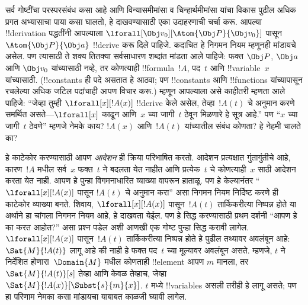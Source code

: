 \documentclass[../../../include/open-logic-section]{subfiles}
\begin{document}


सर्व गोष्टींचा परस्परसंबंध कसा आहे आणि विन्यासमीमांसा व
चिन्हार्थमीमांसा यांचा विकास पुढील अधिक प्रगत अभ्यासाचा पाया कसा घालतो,
हे दाखवण्यासाठी एका उदाहरणाची चर्चा करू. आपल्या !!{derivation} पद्धतींनी
आपल्याला $\lforall[\Obj v_0][\Atom{\Obj P}{\Obj v_0}]$ पासून
$\Atom{\Obj P}{\Obj a}$ !!{derive} करू दिले पाहिजे. कदाचित हे निगमन नियम
म्हणूनही मांडायचे असेल. पण त्यासाठी ते शक्य तितक्या सर्वसाधारण शब्दांत
मांडता आले पाहिजे: फक्त $\Obj P$, $\Obj a$ आणि $\Obj v_0$ यांच्यासाठी
नव्हे, तर कोणत्याही !!{formula}~$!A$, पद~$t$ आणि !!{variable}~$x$
यांच्यासाठी. (!!{constant}s ही पदे असतात हे आठवा; पण !!{constant}s आणि
!!{function}s यांच्यापासून रचलेल्या अधिक जटिल पदांचाही आपण विचार करू.)
म्हणून आपल्याला असे काहीतरी म्हणता आले पाहिजे: ``जेव्हा तुम्ही
$\lforall[x][!A(x)]$ !!{derive} केले असेल, तेव्हा~$!A(t)$ चे अनुमान
करणे समर्थित असते---$\lforall[x]$ काढून आणि~$x$ च्या जागी~$t$ ठेवून
मिळणारे हे सूत्र आहे.'' पण ``$x$ च्या जागी~$t$ ठेवणे'' म्हणजे नेमके
काय? $!A(x)$ आणि~$!A(t)$ यांच्यातील संबंध कोणता? हे नेहमी चालते का?
%

हे काटेकोर करण्यासाठी आपण \emph{आदेशन} ही क्रिया परिभाषित करतो.
आदेशन प्रत्यक्षात गुंतागुंतीचे आहे, कारण~$!A$ मधील सर्व~$x$ फक्त~$t$ ने
बदलता येत नाहीत आणि प्रत्येक~$t$ चे कोणत्याही~$x$ साठी आदेशन करता येत
नाही. आपण हे पुन्हा विगमनाधारित व्याख्या वापरून हाताळू. पण हे
केल्यानंतर ``$\lforall[x][!A(x)]$ पासून $!A(t)$ चे अनुमान करा'' असा
निगमन नियम निर्दिष्ट करणे ही काटेकोर व्याख्या बनते. शिवाय,
$\lforall[x][!A(x)]$ पासून~$!A(t)$ तार्किकरीत्या निष्पन्न होते या अर्थाने
हा चांगला निगमन नियम आहे, हे दाखवता येईल. पण हे सिद्ध करण्यासाठी प्रथम
दर्शनी ``आपण हे का करत आहोत?'' असा प्रश्न पडेल अशी आणखी एक गोष्ट पुन्हा
सिद्ध करावी लागेल. $\lforall[x][!A(x)]$ पासून~$!A(t)$ तार्किकरीत्या
निष्पन्न होते हे पुढील तथ्यावर अवलंबून आहे: $\Sat{M}{!A(t)}$ लागू आहे
की नाही हे फक्त पद~$t$ च्या मूल्यावर अवलंबून असते. म्हणजे, $t$ ने
निर्देशित होणारा~$\Domain{M}$ मधील कोणताही !!{element} आपण $m$ मानला,
तर $\Sat{M}{!A(t)}[s]$ तेव्हा आणि केवळ तेव्हाच, जेव्हा
$\Sat{M}{!A(x)}[\Subst{s}{m}{x}]$. $t$ मध्ये !!{variable}s असली तरीही
हे लागू असते; पण हा परिणाम नेमका कसा मांडायचा याबाबत काळजी घ्यावी
लागेल.
\end{document}
